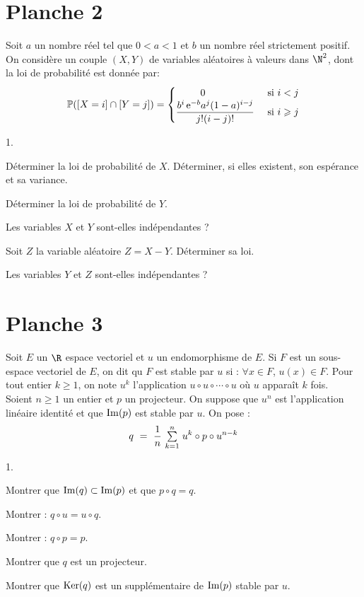 \documentclass[11pt]{article}%
\begin{document}
\newpage


\section*{Planche 2}

\noindent
Soit $a$ un nombre r\'eel tel que $ 0 < a < 1$ et $ b$ un nombre r\'eel 
strictement positif.\\
On consid\`ere un couple $(X, Y)$ de variables al\'eatoires \`a valeurs 
dans  $\N^2$,
dont la loi de probabilit\'e est donn\'ee par:
\[
\Prob(\Ev{X=i}\cap \Ev{Y=j})=\begin{cases}\hfill 0\hfill &\text{ si 
$i<j$}\cr
\dfrac{b^i\, \ee^{-b}a^j(1-a)^{i-j}}{j!(i-j)!}&\text{ si $i\geq 
j$}\end{cases}
\]

\begin{noliste}{1.}
\item
D\'eterminer la loi de probabilit\'e de $X$. D\'eterminer, si elles 
existent, son esp\'erance et sa variance.
\item
D\'eterminer la loi de probabilit\'e de $ Y$.
\item
Les variables $X$ et $Y$ sont-elles ind\'ependantes ?
\item
Soit $Z$ la variable al\'eatoire  $Z = X-Y$. D\'eterminer sa loi.
\item
Les variables $Y$ et $Z$ sont-elles ind\'ependantes ?
\end{noliste}


\newpage


\section*{Planche 3}


\noindent
Soit $E$ un $\R$ espace vectoriel et $u$ un endomorphisme de $E$. Si 
$F$ est un sous-espace vectoriel de $E$, on dit qu $F$ est stable par 
$u$ si : $\forall x \in F$, $u(x) \in F$. Pour tout entier $k \geq 1$, 
on note $u^k$ l'application $u \circ u \circ \cdots \circ u$ où $u$ 
apparaît $k$ fois.\\
Soient $n \geq 1$ un entier et $p$ un projecteur. On suppose que $u^n$ 
est l'application linéaire identité et que $\operatorname{Im}(p)$ est stable par $u$. 
On pose :
\[
  q \ = \ \dfrac{1}{n} \ \Sum{k=1}{n} u^k \circ p \circ u^{n-k}
\]
\begin{noliste}{1.}
  \item Montrer que $\operatorname{Im}(q) \subset \operatorname{Im}(p)$ et que $p \circ q = q$.
  
  \item Montrer : $q \circ u = u \circ q$.
  
  \item Montrer : $q \circ p =p$.
  
  \item Montrer que $q$ est un projecteur.
  
  \item Montrer que $\operatorname{Ker}(q)$ est un supplémentaire de $\operatorname{Im}(p)$ stable 
  par $u$.
\end{noliste}
\end{document}
